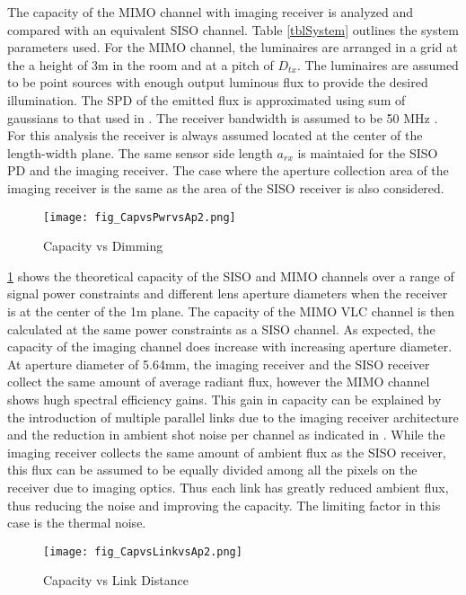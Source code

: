 The capacity of the MIMO channel with imaging receiver is analyzed and compared with an equivalent SISO channel. Table \ref{tblSystem} outlines the system parameters used. For the MIMO channel, the luminaires are arranged in a grid at the a height of 3m in the room and at a pitch of $D_{tx}$. The luminaires are assumed to be point sources with enough output luminous flux to provide the desired illumination. The SPD of the emitted flux is approximated using sum of gaussians to that used in \cite{gru08b}. The receiver bandwidth is assumed to be 50 MHz \cite{zen08a}. For this analysis the receiver is always assumed located at the center of the length-width plane. The same sensor side length $a_{rx}$ is maintaied for the SISO PD and the imaging receiver. The case where the aperture collection area of the imaging receiver is the same as the area of the SISO receiver is also considered. 

\begin{figure}[!t]
	\centering
		\texttt{[image: fig\_CapvsPwrvsAp2.png]}
	\caption{Capacity vs Dimming}
	\label{figCapVsPwr}
\end{figure}

\figurename{\ref{figCapVsPwr}} shows the theoretical capacity of the SISO and MIMO channels over a range of signal power constraints and different lens aperture diameters when the receiver is at the center of the 1m plane. The capacity of the MIMO VLC channel is then calculated at the same power constraints as a SISO channel. As expected, the capacity of the imaging channel does increase with increasing aperture diameter. At aperture diameter of 5.64mm, the imaging receiver and the SISO receiver collect the same amount of average radiant flux, however the MIMO channel shows hugh spectral efficiency gains. This gain in capacity can be explained by the introduction of multiple parallel links due to the imaging receiver architecture and the reduction in ambient shot noise per channel as indicated in \cite{dja00a}. While the imaging receiver collects the same amount of ambient flux as the SISO receiver, this flux can be assumed to be equally divided among all the pixels on the receiver due to imaging optics. Thus each link has greatly reduced ambient flux, thus reducing the noise and improving the capacity. The limiting factor in this case is the thermal noise.

\begin{figure}[!t]
	\centering
		\texttt{[image: fig\_CapvsLinkvsAp2.png]}
	\caption{Capacity vs Link Distance}
	\label{figCapVsLkD}
\end{figure}

